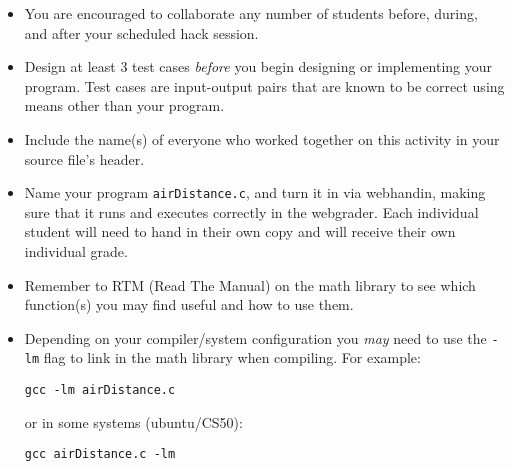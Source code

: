 \documentclass[12pt]{scrartcl}
\begin{document}
\begin{itemize}
  \item You are encouraged to collaborate any number of students 
  before, during, and after your scheduled hack session.  
  \item Design at least 3 test cases \emph{before} you begin
  designing or implementing your program.  Test cases are 
  input-output pairs that are known to be correct using means
  other than your program.
  \item Include the name(s) of everyone who worked together on
  this activity in your source file's header.
  \item Name your program \texttt{airDistance.c}, and
  turn it in via webhandin, making sure that it runs and executes
  correctly in the webgrader.  Each individual student will need
  to hand in their own copy and will receive their own individual
  grade.
  \item Remember to RTM (Read The Manual) on the math library
  to see which function(s) you may find useful and how to use 
  them.
  \item Depending on your compiler/system configuration you \emph{may}
  need to use the \texttt{-lm} flag to link in the math
  library when compiling.  For example: 

  \texttt{gcc -lm airDistance.c}

  or in some systems (ubuntu/CS50):

  \texttt{gcc airDistance.c -lm }

\end{itemize}
  
\end{document}
